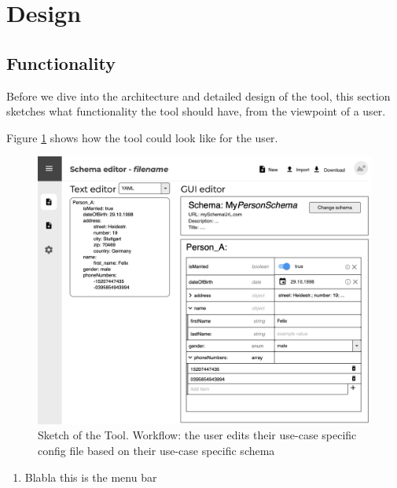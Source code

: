 \documentclass[lettersize,journal]{IEEEtran}
\begin{document}
\section{Design}




\subsection{Functionality}
Before we dive into the architecture and detailed design of the tool, this section sketches what functionality the tool should have, from the viewpoint of a user.

Figure \ref{mockup_gui_config} shows how the tool could look like for the user. 


\begin{figure}[!t]
\includegraphics[width=\textwidth]{mockup_gui_config.png}
\caption{Sketch of the Tool. Workflow: the user edits their use-case specific config file based on their use-case specific schema}
\label{mockup_gui_config}
\end{figure}

\begin{enumerate}
    \item Blabla this is the menu bar
\end{enumerate}
\end{document}
